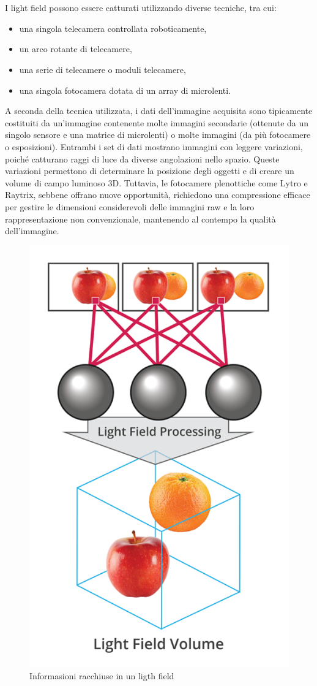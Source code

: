 \\
\\
I light field possono essere catturati utilizzando diverse tecniche, tra cui:
\begin{itemize}
    \item una singola telecamera controllata roboticamente,
    \item un arco rotante di telecamere,
    \item una serie di telecamere o moduli telecamere,
    \item una singola fotocamera dotata di un array di microlenti.
\end{itemize}

A seconda della tecnica utilizzata, i dati dell'immagine acquisita sono tipicamente costituiti da un’immagine contenente molte immagini secondarie (ottenute da un singolo sensore e una matrice di microlenti) o molte immagini (da più fotocamere o esposizioni). 
Entrambi i set di dati mostrano immagini con leggere variazioni, poiché catturano raggi di luce da diverse angolazioni nello spazio. Queste variazioni permettono di determinare la posizione degli oggetti e di creare un volume di campo luminoso 3D. Tuttavia, le fotocamere plenottiche come Lytro e Raytrix, sebbene offrano nuove opportunità, richiedono una compressione efficace per gestire le dimensioni considerevoli delle immagini raw e la loro rappresentazione non convenzionale, mantenendo al contempo la qualità dell'immagine.
\begin{figure}[ht!]
    \centering
    \includegraphics{img/what-is-a-light-field-disparity-processing-lytro.png}
    \caption{Informasioni racchiuse in un ligth field}
    \label{fig:ligthFieldInfo}
\end{figure}